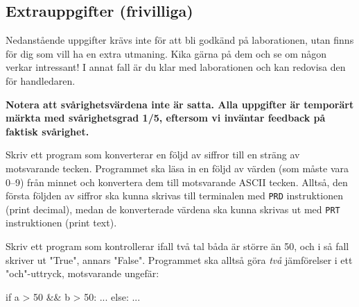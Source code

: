 \subsection{Extrauppgifter (frivilliga)}

Nedanstående uppgifter krävs inte för att bli godkänd på laborationen, utan finns för dig som vill ha en extra utmaning. Kika gärna på dem och se om någon verkar intressant! I annat fall är du klar med laborationen och kan redovisa den för handledaren.

\halfblankline
\noindent\textbf{Notera att svårighetsvärdena inte är satta. Alla uppgifter är temporärt märkta med svårighetsgrad 1/5, eftersom vi inväntar feedback på faktisk svårighet.}

\begin{Extrauppgifter}
    \item {} Skriv ett program som konverterar en följd av siffror till en sträng av motsvarande tecken. Programmet ska läsa in en följd av värden (som måste vara 0--9) från minnet och konvertera dem till motsvarande ASCII tecken. Alltså, den första följden av siffror ska kunna skrivas till terminalen med \texttt{PRD} instruktionen (print decimal), medan de konverterade värdena ska kunna skrivas ut med \texttt{PRT} instruktionen (print text).

    \item {}Skriv ett program som kontrollerar ifall två tal båda är större än 50, och i så fall skriver ut "True", annars "False". Programmet ska alltså göra \emph{två} jämförelser i ett "och"-uttryck, motsvarande ungefär:
    \begin{Code}
        if a > 50 && b > 50:
            ...
        else:
            ...
    \end{Code}
    \vspace{-3mm}


\end{Extrauppgifter}
